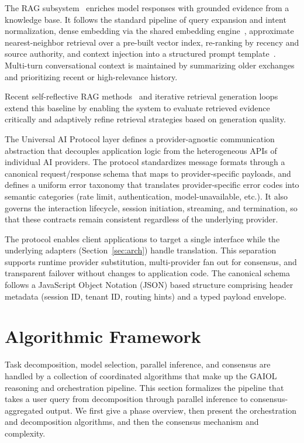 \documentclass{iopjournal}
\begin{document}
The RAG subsystem~\cite{RAG} enriches model responses with grounded evidence from a knowledge base. It follows the standard pipeline of query expansion and intent normalization, dense embedding via the shared embedding engine~\cite{DPR}, approximate nearest-neighbor retrieval over a pre-built vector index, re-ranking by recency and source authority, and context injection into a structured prompt template~\cite{RAG}. Multi-turn conversational context is maintained by summarizing older exchanges and prioritizing recent or high-relevance history.

Recent self-reflective RAG methods~\cite{SelfRAG_ICLR24} and iterative retrieval generation loops~\cite{IterativeRAG_EMNLP23} extend this baseline by enabling the system to evaluate retrieved evidence critically and adaptively refine retrieval strategies based on generation quality.

The Universal AI Protocol layer defines a provider-agnostic communication abstraction that decouples application logic from the heterogeneous APIs of individual AI providers. The protocol standardizes message formats through a canonical request/response schema that maps to provider-specific payloads, and defines a uniform error taxonomy that translates provider-specific error codes into semantic categories (rate limit, authentication, model-unavailable, etc.). It also governs the interaction lifecycle, session initiation, streaming, and termination, so that these contracts remain consistent regardless of the underlying provider.

The protocol enables client applications to target a single interface while the underlying adapters (Section~\ref{sec:arch}) handle translation. This separation supports runtime provider substitution, multi-provider fan out for consensus, and transparent failover without changes to application code. The canonical schema follows a JavaScript Object Notation (JSON) based structure comprising header metadata (session ID, tenant ID, routing hints) and a typed payload envelope.

\section{Algorithmic Framework}
\label{sec:algo}

Task decomposition, model selection, parallel inference, and consensus are handled by a collection of coordinated algorithms that make up the GAIOL reasoning and orchestration pipeline. This section formalizes the pipeline that takes a user query from decomposition through parallel inference to consensus-aggregated output. We first give a phase overview, then present the orchestration and decomposition algorithms, and then the consensus mechanism and complexity.
\end{document}

